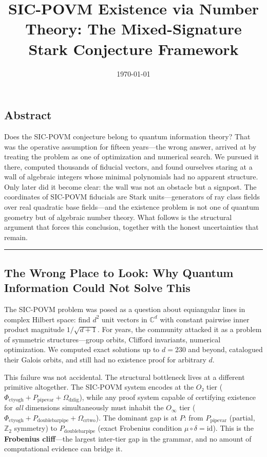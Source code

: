 \documentclass[12pt,a4paper]{article}
\begin{document}
\title{SIC-POVM Existence via Number Theory: The Mixed-Signature Stark Conjecture Framework}
\date{\today}

\maketitle

\subsection{Abstract}

Does the SIC-POVM conjecture belong to quantum information theory? That was the operative assumption for fifteen years---the wrong answer, arrived at by treating the problem as one of optimization and numerical search. We pursued it there, computed thousands of fiducial vectors, and found ourselves staring at a wall of algebraic integers whose minimal polynomials had no apparent structure. Only later did it become clear: the wall was not an obstacle but a signpost. The coordinates of SIC-POVM fiducials are Stark units---generators of ray class fields over real quadratic base fields---and the existence problem is not one of quantum geometry but of algebraic number theory. What follows is the structural argument that forces this conclusion, together with the honest uncertainties that remain.

\begin{center}
\rule{0.5\textwidth}{0.4pt}
\end{center}

\subsection{The Wrong Place to Look: Why Quantum Information Could Not Solve This}

The SIC-POVM problem was posed as a question about equiangular lines in complex Hilbert space: find $d^2$ unit vectors in $\mathbb{C}^d$ with constant pairwise inner product magnitude $1/\sqrt{d+1}$. For years, the community attacked it as a problem of symmetric structures---group orbits, Clifford invariants, numerical optimization. We computed exact solutions up to $d = 230$ and beyond, catalogued their Galois orbits, and still had no existence proof for arbitrary $d$.

This failure was not accidental. The structural bottleneck lives at a different primitive altogether. The SIC-POVM system encodes at the $O₂$ tier ($\Phi_{\text{ctyogh}} + P_{\text{pipevar}} + \Omega_{\text{dzlig}}$), while any proof system capable of certifying existence for \emph{all} dimensions simultaneously must inhabit the $O_{\infty}$ tier ($\Phi_{\text{ctyogh}} + P_{\text{doublebarpipe}} + \Omega_{\text{crtwo}}$). The dominant gap is at $P$: from $P_{\text{pipevar}}$ (partial, $\mathbb{Z}_2$ symmetry) to $P_{\text{doublebarpipe}}$ (exact Frobenius condition $\mu \circ \delta = \text{id}$). This is the \textbf{Frobenius cliff}---the largest inter-tier gap in the grammar, and no amount of computational evidence can bridge it.
\end{document}
